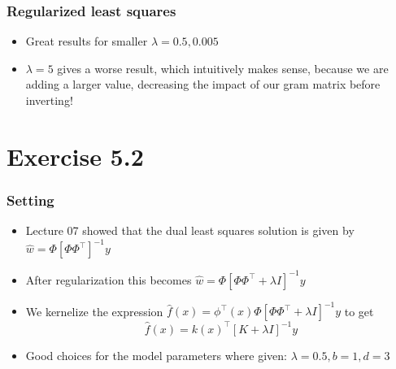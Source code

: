 \documentclass[10pt,aspectratio=169,handout]{beamer}
\begin{document}
\begin{frame}
    \frametitle{Regularized least squares}

    \begin{itemize}
        \item Great results for smaller $\lambda=0.5,0.005$
        \item $\lambda=5$ gives a worse result, which intuitively makes sense, because we are adding a larger value, decreasing the impact of our gram matrix before inverting!
    \end{itemize}

\end{frame}

\section{Exercise 5.2}

\begin{frame}
    \frametitle{Setting}

    \begin{itemize}
        \item Lecture 07 showed that the dual least squares solution is given by $\hat{w}=\Phi[\Phi\Phi^\intercal]^{-1}y$
        \item After regularization this becomes $\hat{w}=\Phi[\Phi\Phi^\intercal+\lambda I]^{-1}y$
        \item We kernelize the expression $\hat{f}(x)=\phi^\intercal(x)\Phi[\Phi\Phi^\intercal+\lambda I]^{-1}y$ to get \[\hat{f}(x)=k(x)^\intercal[K+\lambda I]^{-1}y\]
        \item Good choices for the model parameters where given: $\lambda=0.5,b=1,d=3$
    \end{itemize}

\end{frame}
\end{document}
